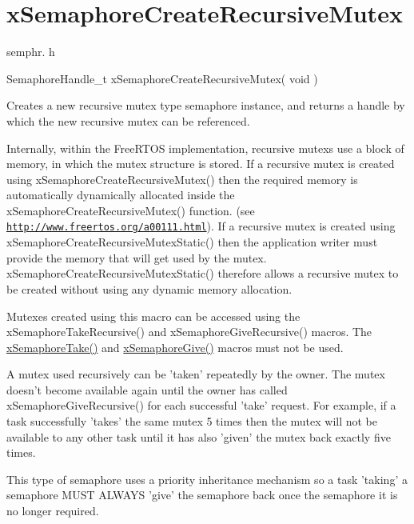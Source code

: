 \hypertarget{group__xSemaphoreCreateRecursiveMutex}{\section{x\-Semaphore\-Create\-Recursive\-Mutex}
\label{group__xSemaphoreCreateRecursiveMutex}
}
semphr. h 
\begin{DoxyPre}SemaphoreHandle\_t xSemaphoreCreateRecursiveMutex( void )\end{DoxyPre}


Creates a new recursive mutex type semaphore instance, and returns a handle by which the new recursive mutex can be referenced.

Internally, within the Free\-R\-T\-O\-S implementation, recursive mutexs use a block of memory, in which the mutex structure is stored. If a recursive mutex is created using x\-Semaphore\-Create\-Recursive\-Mutex() then the required memory is automatically dynamically allocated inside the x\-Semaphore\-Create\-Recursive\-Mutex() function. (see \href{http://www.freertos.org/a00111.html}{\tt http\-://www.\-freertos.\-org/a00111.\-html}). If a recursive mutex is created using x\-Semaphore\-Create\-Recursive\-Mutex\-Static() then the application writer must provide the memory that will get used by the mutex. x\-Semaphore\-Create\-Recursive\-Mutex\-Static() therefore allows a recursive mutex to be created without using any dynamic memory allocation.

Mutexes created using this macro can be accessed using the x\-Semaphore\-Take\-Recursive() and x\-Semaphore\-Give\-Recursive() macros. The \hyperlink{semphr_8h_af116e436d2a5ae5bd72dbade2b5ea930}{x\-Semaphore\-Take()} and \hyperlink{semphr_8h_aae55761cabfa9bf85c8f4430f78c0953}{x\-Semaphore\-Give()} macros must not be used.

A mutex used recursively can be 'taken' repeatedly by the owner. The mutex doesn't become available again until the owner has called x\-Semaphore\-Give\-Recursive() for each successful 'take' request. For example, if a task successfully 'takes' the same mutex 5 times then the mutex will not be available to any other task until it has also 'given' the mutex back exactly five times.

This type of semaphore uses a priority inheritance mechanism so a task 'taking' a semaphore M\-U\-S\-T A\-L\-W\-A\-Y\-S 'give' the semaphore back once the semaphore it is no longer required.

